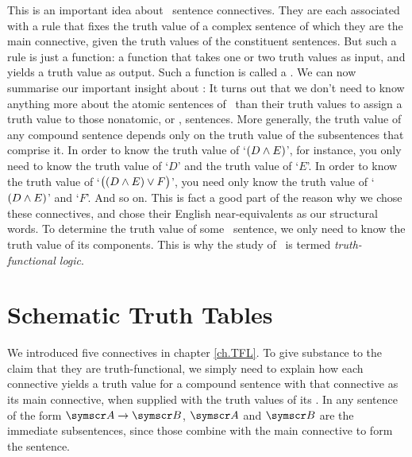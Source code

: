 This is an important idea about \TFL\ sentence connectives. They are each associated with a rule that fixes the truth value of a complex sentence of which they are the main connective, given the truth values of the constituent sentences. But such a rule is just a function: a function that takes one or two truth values as input, and yields a truth value as output. Such a function is called a . We can now summarise our important insight about \TFL: 
It turns out that we don't need to know anything more about the atomic sentences of \TFL\ than their truth values to assign a truth value to those nonatomic, or , sentences. More generally, the truth value of any compound sentence depends only on the truth value of the subsentences that comprise it. In order to know the truth value of `$(D \wedge E)$', for instance, you only need to know the truth value of `$D$' and the truth value of `$E$'. In order to know the truth value of `$\bigl( (D \wedge E) \vee F\bigr)$', you need only know the truth value of `$(D \wedge E)$' and `$F$'. And so on. This is fact a good part of the reason why we chose these connectives, and chose their English near-equivalents as our structural words. To determine the truth value of some \TFL\ sentence, we only need to know the truth value of its components. This is why the study of \TFL\ is termed \emph{truth-functional logic}.

\section{Schematic Truth Tables}\label{s:SchematicTruthTables}

We introduced five connectives in chapter \ref{ch.TFL}. To give substance to the claim that they are truth-functional, we simply need to explain how each connective yields a truth value for a compound sentence with that connective as its main connective, when supplied with the truth values of its . In any sentence of the form $\meta{A} \eif \meta{B}$, $\meta{A}$ and $\meta{B}$ are the immediate subsentences, since those combine with the main connective to form the sentence.

